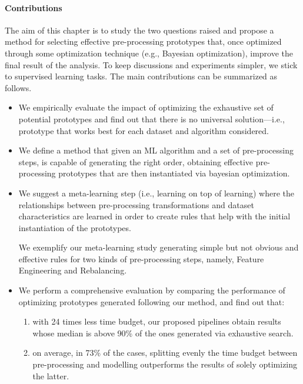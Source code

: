 \paragraph{Contributions} The aim of this chapter is to study the two questions raised and propose a method for selecting effective pre-processing prototypes that, once optimized through some optimization technique (e.g., Bayesian optimization), improve the final result of the analysis.
To keep discussions and experiments simpler, we stick to supervised learning tasks.
The main contributions can be summarized as follows.
\begin{itemize}
    \item We empirically evaluate the impact of optimizing the exhaustive set of potential prototypes and find out that
	there is no universal solution---i.e., prototype that works best for each dataset and algorithm considered.
    \item We define a method that given an ML algorithm and a set of pre-processing steps, is capable of generating the right order, obtaining effective pre-processing prototypes that are then instantiated via bayesian optimization.
    \item We suggest a meta-learning step (i.e., learning on top of learning) where the relationships between pre-processing transformations and dataset characteristics are learned in order to create rules that help with the initial instantiation of the prototypes.

	We exemplify our meta-learning study generating simple but not obvious and effective rules for two kinds of pre-processing steps, namely, Feature Engineering and Rebalancing.

    \item We perform a comprehensive evaluation by comparing the performance of optimizing prototypes generated following our method, and find out that:
    \begin{enumerate}
        \item with 24 times less time budget, our proposed pipelines obtain results whose median is above 90\% of the ones generated via exhaustive search.
        \item on average, in 73\% of the cases, splitting evenly the time budget between pre-processing and modelling outperforms the results of solely optimizing the latter.
    \end{enumerate}
\end{itemize}

